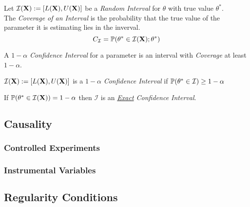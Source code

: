 \documentclass[11pt,a4paper]{article}
\begin{document}
Let $\mathcal{I}(\textbf{X}):=[L(\textbf{X}),U(\textbf{X})]$ be a \textit{Random Interval} for $\theta$ with true value $\theta^*$.\\
The \textit{Coverage of an Interval} is the probability that the true value of the parameter it is estimating lies in the inverval.
$$C_\mathcal{I}=\mathbb{P}(\theta^*\in\mathcal{I}(\textbf{X});\theta^*)$$

A $1-\alpha$ \textit{Confidence Interval} for a parameter is an interval with \textit{Coverage} at least $1-\alpha$.
\begin{center}
$\mathcal{I}(\textbf{X}):=[L(\textbf{X}),U(\textbf{X})]$ is a $1-\alpha$ \textit{Confidence Interval} if $\mathbb{P}(\theta^*\in\mathcal{I})\geq1-\alpha$
\end{center}
\nb If $\mathbb{P}(\theta^*\in\mathcal{I}(\textbf{X}))=1-\alpha$ then $\mathcal{I}$ is an \textit{\underline{Exact} Confidence Interval}.\\




\subsection{Causality}


 

\subsubsection{Controlled Experiments}


\subsubsection{Instrumental Variables}


\subsection{Regularity Conditions}
\end{document}
